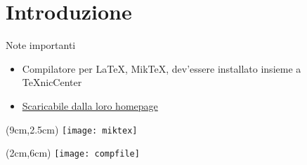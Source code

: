 \section{Introduzione}
  \begin{frame}{Note importanti}

    \begin{itemize}
      \item Compilatore per \LaTeX, MikTeX, dev'essere 
installato insieme a TeXnicCenter
      \item \href{https://miktex.org/download}{Scaricabile dalla loro homepage}
    \end{itemize}
    
    \begin{textblock*}{5cm}(9cm,2.5cm)
      \texttt{[image: miktex]}
    \end{textblock*}

    \begin{textblock*}{5cm}(2cm,6cm)
      \texttt{[image: compfile]}
    \end{textblock*}

  \end{frame}

